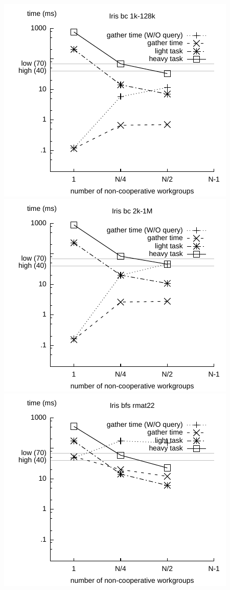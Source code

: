 \documentclass[sigconf]{acmart}
\begin{document}
{\includegraphics[width=.7\columnwidth]{images/barrier/iris_bc_1k_128k.pdf} \\
\includegraphics[width=.7\columnwidth]{images/barrier/iris_bc_2k_1M.pdf} \\
\includegraphics[width=.7\columnwidth]{images/barrier/iris_bfs_rmat22.pdf} \\
}
\end{document}
